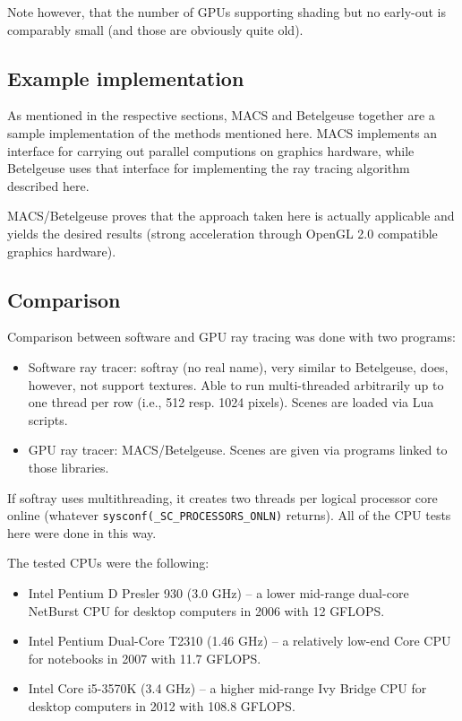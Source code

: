\documentclass[english,fleqn,10pt,twocolumn]{article}
\begin{document}
Note however, that the number of GPUs supporting shading but no early-out is comparably small (and those are obviously quite old).

\subsection{Example implementation}

As mentioned in the respective sections, MACS and Betelgeuse together are a sample implementation of the methods mentioned here. MACS implements an interface for carrying out parallel computions on graphics hardware, while Betelgeuse
uses that interface for implementing the ray tracing algorithm described here.

MACS/Betelgeuse proves that the approach taken here is actually applicable and yields the desired results (strong acceleration through OpenGL 2.0 compatible graphics hardware).

\subsection{Comparison}

Comparison between software and GPU ray tracing was done with two programs:
\begin{itemize}
    \item Software ray tracer: softray (no real name), very similar to Betelgeuse, does, however, not support textures. Able to run multi-threaded arbitrarily up to one thread per row (i.e., 512 resp. 1024 pixels). Scenes are loaded via
        Lua scripts.
    \item GPU ray tracer: MACS/Betelgeuse. Scenes are given via programs linked to those libraries.
\end{itemize}

If softray uses multithreading, it creates two threads per logical processor core online (whatever {\tt sysconf(\_SC\_PROCESSORS\_ONLN)} returns). All of the CPU tests here were done in this way.

The tested CPUs were the following:
\begin{itemize}
    \item Intel Pentium D Presler 930 (3.0 GHz) -- a lower mid-range dual-core NetBurst CPU for desktop computers in 2006 with 12 GFLOPS.
    \item Intel Pentium Dual-Core T2310 (1.46 GHz) -- a relatively low-end Core CPU for notebooks in 2007 with 11.7 GFLOPS.
    \item Intel Core i5-3570K (3.4 GHz) -- a higher mid-range Ivy Bridge CPU for desktop computers in 2012 with 108.8 GFLOPS.
\end{itemize}
\end{document}
